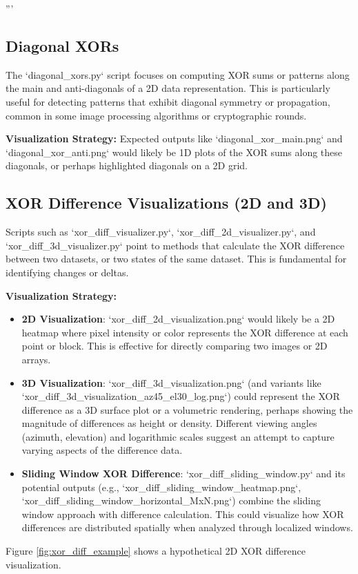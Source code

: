 '''\documentclass[conference]{IEEEtran}
\begin{document}
\subsection{Diagonal XORs}
The `diagonal_xors.py` script focuses on computing XOR sums or patterns along the main and anti-diagonals of a 2D data representation. This is particularly useful for detecting patterns that exhibit diagonal symmetry or propagation, common in some image processing algorithms or cryptographic rounds.

\textbf{Visualization Strategy:} Expected outputs like `diagonal_xor_main.png` and `diagonal_xor_anti.png` would likely be 1D plots of the XOR sums along these diagonals, or perhaps highlighted diagonals on a 2D grid.

\subsection{XOR Difference Visualizations (2D and 3D)}
Scripts such as `xor_diff_visualizer.py`, `xor_diff_2d_visualizer.py`, and `xor_diff_3d_visualizer.py` point to methods that calculate the XOR difference between two datasets, or two states of the same dataset. This is fundamental for identifying changes or deltas.

\textbf{Visualization Strategy:}
\begin{itemize}
    \item \textbf{2D Visualization}: `xor_diff_2d_visualization.png` would likely be a 2D heatmap where pixel intensity or color represents the XOR difference at each point or block. This is effective for directly comparing two images or 2D arrays.
    \item \textbf{3D Visualization}: `xor_diff_3d_visualization.png` (and variants like `xor_diff_3d_visualization_az45_el30_log.png`) could represent the XOR difference as a 3D surface plot or a volumetric rendering, perhaps showing the magnitude of differences as height or density. Different viewing angles (azimuth, elevation) and logarithmic scales suggest an attempt to capture varying aspects of the difference data.
    \item \textbf{Sliding Window XOR Difference}: `xor_diff_sliding_window.py` and its potential outputs (e.g., `xor_diff_sliding_window_heatmap.png`, `xor_diff_sliding_window_horizontal_MxN.png`) combine the sliding window approach with difference calculation. This could visualize how XOR differences are distributed spatially when analyzed through localized windows.
\end{itemize}
Figure \ref{fig:xor_diff_example} shows a hypothetical 2D XOR difference visualization.
\end{document}
